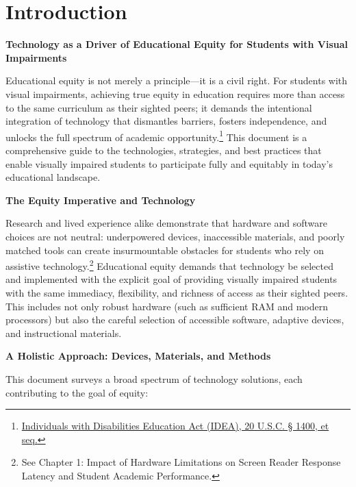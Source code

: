 \chapter*{Introduction}\label{intro}

\textbf{Technology as a Driver of Educational Equity for Students with Visual Impairments}

Educational equity is not merely a principle—it is a civil right. For students with visual impairments, achieving true equity in education requires more than access to the same curriculum as their sighted peers; it demands the intentional integration of technology that dismantles barriers, fosters independence, and unlocks the full spectrum of academic opportunity.\footnote{\href{http://sites.ed.gov/idea/statuteregulations/}{Individuals with Disabilities Education Act (IDEA), 20 U.S.C. § 1400, et seq.}} This document is a comprehensive guide to the technologies, strategies, and best practices that enable visually impaired students to participate fully and equitably in today’s educational landscape.

\textbf{The Equity Imperative and Technology}

Research and lived experience alike demonstrate that hardware and software choices are not neutral: underpowered devices, inaccessible materials, and poorly matched tools can create insurmountable obstacles for students who rely on assistive technology.\footnote{See Chapter 1: Impact of Hardware Limitations on Screen Reader Response Latency and Student Academic Performance.} Educational equity demands that technology be selected and implemented with the explicit goal of providing visually impaired students with the same immediacy, flexibility, and richness of access as their sighted peers. This includes not only robust hardware (such as sufficient RAM and modern processors) but also the careful selection of accessible software, adaptive devices, and instructional materials.

\textbf{A Holistic Approach: Devices, Materials, and Methods}

This document surveys a broad spectrum of technology solutions, each contributing to the goal of equity:


